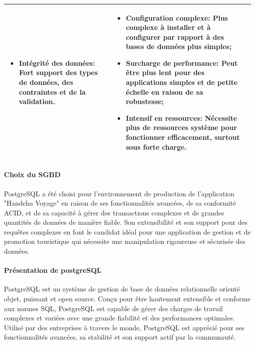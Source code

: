 \documentclass[12pt]{report}
\begin{document}
\begin{longtable}{|p{3cm}|p{5.5cm}|p{5.5cm}|}
\begin{itemize}
							\item \textbf{Intégrité des données:} Fort support des types de données, des contraintes et de la validation.
						\end{itemize} &
						\begin{itemize}
							\item \textbf{Configuration complexe:} Plus complexe à installer et à configurer par rapport à des bases de données plus simples;
							\item \textbf{Surcharge de performance:} Peut être plus lent pour des applications simples et de petite échelle en raison de sa robustesse;
							\item \textbf{Intensif en ressources:} Nécessite plus de ressources système pour fonctionner efficacement, surtout sous forte charge.
						\end{itemize} \\
						\hline
				    \end{longtable}

				\paragraph{Choix du SGBD} 
				
				 PostgreSQL a été choisi pour l'environnement de production de l'application "Handeha Voyage" en raison de ses fonctionnalités avancées, de sa conformité ACID, et de sa capacité à gérer des transactions complexes et de grandes quantités de données de manière fiable. Son extensibilité et son support pour des requêtes complexes en font le candidat idéal pour une application de gestion et de promotion touristique qui nécessite une manipulation rigoureuse et sécurisée des données.

				\paragraph{Présentation de postgreSQL}

				PostgreSQL est un système de gestion de base de données relationnelle orienté objet, puissant et open source. Conçu pour être hautement extensible et conforme aux normes SQL, PostgreSQL est capable de gérer des charges de travail complexes et variées avec une grande fiabilité et des performances optimales. Utilisé par des entreprises à travers le monde, PostgreSQL est apprécié pour ses fonctionnalités avancées, sa stabilité et son support actif par la communauté.\\
\end{document}
